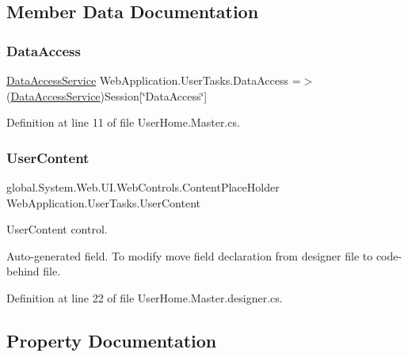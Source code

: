\subsection{Member Data Documentation}
\mbox{\label{classWebApplication_1_1UserTasks_a80618e70f1a8743f5da5880445ac7e67}} 
\subsubsection{\texorpdfstring{DataAccess}{DataAccess}}
{\footnotesize\ttfamily \mbox{\hyperlink{classDataBaseAccess_1_1DataAccessService}{Data\+Access\+Service}} Web\+Application.\+User\+Tasks.\+Data\+Access =$>$ (\mbox{\hyperlink{classDataBaseAccess_1_1DataAccessService}{Data\+Access\+Service}})Session\mbox{[}\char`\"{}Data\+Access\char`\"{}\mbox{]}}



Definition at line 11 of file User\+Home.\+Master.\+cs.

\mbox{\label{classWebApplication_1_1UserTasks_aa929c7e9c76317af65221bfb4ead895d}} 
\subsubsection{\texorpdfstring{UserContent}{UserContent}}
{\footnotesize\ttfamily global.\+System.\+Web.\+U\+I.\+Web\+Controls.\+Content\+Place\+Holder Web\+Application.\+User\+Tasks.\+User\+Content\hspace{0.3cm}{\ttfamily [protected]}}



User\+Content control. 

Auto-\/generated field. To modify move field declaration from designer file to code-\/behind file. 

Definition at line 22 of file User\+Home.\+Master.\+designer.\+cs.



\subsection{Property Documentation}
\mbox{\label{classWebApplication_1_1UserTasks_a164d46c79400b72316927ce0f84f6db8}} 
